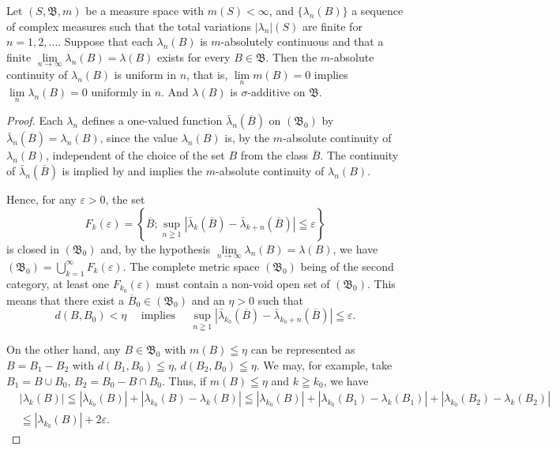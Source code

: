 \begin{theoremn}\label{thm:II.2.VitaliHahnSaks} Let $(S, \mathfrak{B}, m)$ be a measure space with $m(S) < \infty$, and $\{\lambda_n(B)\}$ a sequence of complex measures such that the total variations $|\lambda_n|(S)$ are finite for $n = 1, 2, \ldots$. Suppose that each $\lambda_n(B)$ is $m$-absolutely continuous and that a finite $\lim\limits_{n \to \infty} \lambda_n(B) = \lambda(B)$ exists for every $B \in \mathfrak{B}$. Then the $m$-absolute continuity of $\lambda_n(B)$ is uniform in $n$, that is, $\lim\limits_{n} m(B) = 0$ implies $\lim\limits_{n} \lambda_n(B) = 0$ uniformly in $n$. And $\lambda(B)$ is $\sigma$-additive on $\mathfrak{B}$.

\end{theoremn}
\begin{proof}
 Each $\lambda_{n}$ defines a one-valued function $\bar{\lambda}_{n}(\overline{B})$ on $(\mathfrak{B}_0)$ by $\bar{\lambda}_{n}(\overline{B}) = \lambda_{n}(B)$, since the value $\lambda_{n}(B)$ is, by the $m$-absolute continuity of $\lambda_{n}(B)$, independent of the choice of the set $B$ from the class $\overline{B}$. The continuity of $\bar{\lambda}_{n}(\overline{B})$ is implied by and implies the $m$-absolute continuity of $\lambda_{n}(B)$. 

Hence, for any $\varepsilon > 0$, the set 
\[
F _{k} (\varepsilon) = \left\{\overline {{B}}; \sup\limits _{n \geqq 1} \left| \bar {\lambda} _{k} (\overline {{B}}) - \bar {\lambda} _{k+n} (\overline {{B}}) \right| \leqq \varepsilon \right\}
\]
is closed in $(\mathfrak{B}_0)$ and, by the hypothesis $\lim\limits_{n\to \infty}\lambda_n(B) = \lambda (B)$, we have $(\mathfrak{B}_0) = \bigcup\limits_{k=1}^{\infty}F_k(\varepsilon)$. The complete metric space $(\mathfrak{B}_0)$ being of the second category, at least one $F_{k_0}(\varepsilon)$ must contain a non-void open set of $(\mathfrak{B}_0)$. This means that there exist a $\overline{B}_0\in (\mathfrak{B}_0)$ and an $\eta >0$ such that 
\[
d (B, B _{0}) < \eta \quad \text{ implies } \quad \sup\limits _{n \geqq 1} | \bar {\lambda} _ {k _{0}} (\overline {{B}}) - \bar {\lambda} _ {k _{0} + n} (\overline {{B}}) | \leqq \varepsilon .
\]

On the other hand, any $B \in \mathfrak{B}_0$ with $m(B) \leqq \eta$ can be represented as $B = B_1 - B_2$ with $d(B_1, B_0) \leqq \eta$, $d(B_2, B_0) \leqq \eta$. We may, for example, take $B_1 = B \cup B_0$, $B_2 = B_0 - B \cap B_0$. Thus, if $m(B) \leqq \eta$ and $k \geqq k_0$, we have 
\[
\begin{aligned}
&\left| \lambda_{k} (B) \right|  \leqq \left| \lambda_ {k _{0}} (B) \right| + \left| \lambda_ {k _{0}} (B) - \lambda_{k} (B) \right| \leqq \left| \lambda_ {k _{0}} (B) \right| + \left| \lambda_ {k _{0}} (B _{1}) - \lambda_{k} (B _{1}) \right| + \left| \lambda_ {k _{0}} (B _{2}) - \lambda_{k} (B _{2}) \right| \\
&\leqq \left| \lambda_ {k _{0}} (B) \right| + 2 \varepsilon .
\end{aligned}
\]


\end{proof}

